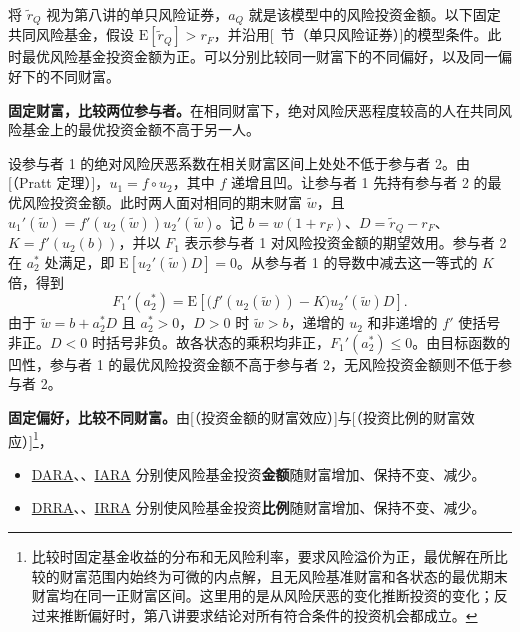 将 $\tilde r_Q$ 视为第八讲的单只风险证券，$a_Q$ 就是该模型中的风险投资金额。以下固定共同风险基金，假设 $\mathrm E[\tilde r_Q]>r_F$，并沿用[~节（单只风险证券）]的模型条件。此时最优风险基金投资金额为正。可以分别比较同一财富下的不同偏好，以及同一偏好下的不同财富。

\textbf{固定财富，比较两位参与者。}在相同财富下，绝对风险厌恶程度较高的人在共同风险基金上的最优投资金额不高于另一人。

\begin{solution}[label-content={证明},blank-type=none]
设参与者 1 的绝对风险厌恶系数在相关财富区间上处处不低于参与者 2。由[（Pratt 定理）]，$u_1=f\circ u_2$，其中 $f$ 递增且凹。让参与者 1 先持有参与者 2 的最优风险投资金额。此时两人面对相同的期末财富 $\tilde w$，且 $u_1'(\tilde w)=f'(u_2(\tilde w))u_2'(\tilde w)$。记 $b=w(1+r_F)$、$D=\tilde r_Q-r_F$、$K=f'(u_2(b))$，并以 $F_1$ 表示参与者 1 对风险投资金额的期望效用。参与者 2 在 $a_2^*$ 处满足，即 $\mathrm E[u_2'(\tilde w)D]=0$。从参与者 1 的导数中减去这一等式的 $K$ 倍，得到
\[
 F_1'(a_2^*)=
 \mathrm E\!\left[\bigl(f'(u_2(\tilde w))-K\bigr)u_2'(\tilde w)D\right].
\]
由于 $\tilde w=b+a_2^*D$ 且 $a_2^*>0$，$D>0$ 时 $\tilde w>b$，递增的 $u_2$ 和非递增的 $f'$ 使括号非正。$D<0$ 时括号非负。故各状态的乘积均非正，$F_1'(a_2^*)\le0$。由目标函数的凹性，参与者 1 的最优风险投资金额不高于参与者 2，无风险投资金额则不低于参与者 2。
\end{solution}

\textbf{固定偏好，比较不同财富。}由[（投资金额的财富效应）]与[（投资比例的财富效应）]\footnote{比较时固定基金收益的分布和无风险利率，要求风险溢价为正，最优解在所比较的财富范围内始终为可微的内点解，且无风险基准财富和各状态的最优期末财富均在同一正财富区间。这里用的是从风险厌恶的变化推断投资的变化；反过来推断偏好时，第八讲要求结论对所有符合条件的投资机会都成立。}，
\begin{itemize}
 \item \hyperlink{wj-risk-aversion-wealth-changes}{\textcolor{WJReferenceColor}{DARA}}、、\hyperlink{wj-risk-aversion-wealth-changes}{\textcolor{WJReferenceColor}{IARA}} 分别使风险基金投资\textbf{金额}随财富增加、保持不变、减少。
 \item \hyperlink{wj-risk-aversion-wealth-changes}{\textcolor{WJReferenceColor}{DRRA}}、、\hyperlink{wj-risk-aversion-wealth-changes}{\textcolor{WJReferenceColor}{IRRA}} 分别使风险基金投资\textbf{比例}随财富增加、保持不变、减少。
\end{itemize}

